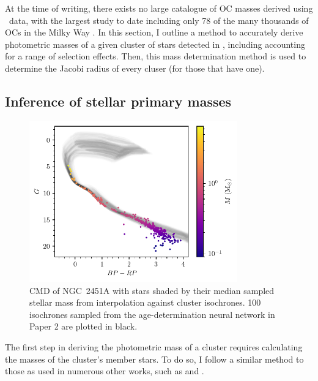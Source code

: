 At the time of writing, there exists no large catalogue of OC masses derived using \gaia\ data, with the largest study to date including only 78 of the many thousands of OCs in the Milky Way \citep{cordoni_photometric_binaries_2023}. In this section, I outline a method to accurately derive photometric masses of a given cluster of stars detected in \gaia, including accounting for a range of selection effects. Then, this mass determination method is used to determine the Jacobi radius of every cluser (for those that have one).


\subsection{Inference of stellar primary masses}
\label{sec:dynamics:masses:isochrones}

\begin{figure}[t]
    \centering
    \includegraphics[width=0.8\textwidth]{fig/c4/masses_stellar.pdf}
    \caption[CMD of NGC~2451A with stars shaded by their median sampled stellar mass]{CMD of NGC~2451A with stars shaded by their median sampled stellar mass from interpolation against cluster isochrones. 100 isochrones sampled from the age-determination neural network in Paper 2 are plotted in black.}
    \label{fig:dynamics:masses:stellar_masses}
 \end{figure}

 The first step in deriving the photometric mass of a cluster requires calculating the masses of the cluster's member stars. To do so, I follow a similar method to those as used in numerous other works, such as \cite{meingast_extended_2021} and \cite{cordoni_photometric_binaries_2023}.

